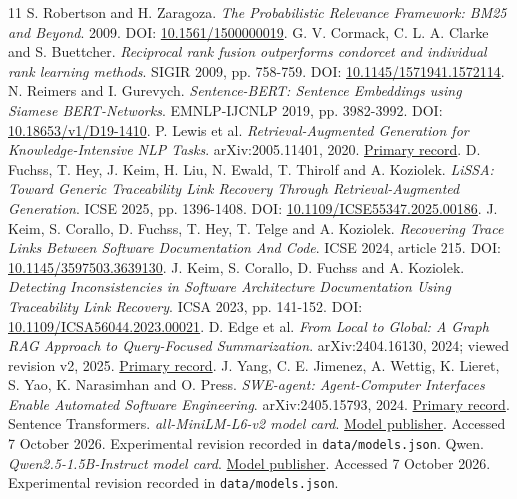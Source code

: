 \documentclass[conference,a4paper]{IEEEtran}
\begin{document}
\begin{thebibliography}{11}
 S. Robertson and H. Zaragoza. \emph{The Probabilistic Relevance Framework: BM25 and Beyond}. 2009. DOI: \href{https://doi.org/10.1561/1500000019}{10.1561/1500000019}.
 G. V. Cormack, C. L. A. Clarke and S. Buettcher. \emph{Reciprocal rank fusion outperforms condorcet and individual rank learning methods}. SIGIR 2009, pp. 758-759. DOI: \href{https://doi.org/10.1145/1571941.1572114}{10.1145/1571941.1572114}.
 N. Reimers and I. Gurevych. \emph{Sentence-BERT: Sentence Embeddings using Siamese BERT-Networks}. EMNLP-IJCNLP 2019, pp. 3982-3992. DOI: \href{https://aclanthology.org/D19-1410/}{10.18653/v1/D19-1410}.
 P. Lewis et al. \emph{Retrieval-Augmented Generation for Knowledge-Intensive NLP Tasks}. arXiv:2005.11401, 2020. \href{https://arxiv.org/abs/2005.11401}{Primary record}.
 D. Fuchss, T. Hey, J. Keim, H. Liu, N. Ewald, T. Thirolf and A. Koziolek. \emph{LiSSA: Toward Generic Traceability Link Recovery Through Retrieval-Augmented Generation}. ICSE 2025, pp. 1396-1408. DOI: \href{https://ardoco.de/c/icse25}{10.1109/ICSE55347.2025.00186}.
 J. Keim, S. Corallo, D. Fuchss, T. Hey, T. Telge and A. Koziolek. \emph{Recovering Trace Links Between Software Documentation And Code}. ICSE 2024, article 215. DOI: \href{https://ardoco.de/c/icse24}{10.1145/3597503.3639130}.
 J. Keim, S. Corallo, D. Fuchss and A. Koziolek. \emph{Detecting Inconsistencies in Software Architecture Documentation Using Traceability Link Recovery}. ICSA 2023, pp. 141-152. DOI: \href{https://ardoco.de/c/icsa23}{10.1109/ICSA56044.2023.00021}.
 D. Edge et al. \emph{From Local to Global: A Graph RAG Approach to Query-Focused Summarization}. arXiv:2404.16130, 2024; viewed revision v2, 2025. \href{https://arxiv.org/abs/2404.16130}{Primary record}.
 J. Yang, C. E. Jimenez, A. Wettig, K. Lieret, S. Yao, K. Narasimhan and O. Press. \emph{SWE-agent: Agent-Computer Interfaces Enable Automated Software Engineering}. arXiv:2405.15793, 2024. \href{https://arxiv.org/abs/2405.15793}{Primary record}.
 Sentence Transformers. \emph{all-MiniLM-L6-v2 model card}. \href{https://huggingface.co/sentence-transformers/all-MiniLM-L6-v2}{Model publisher}. Accessed 7 October 2026. Experimental revision recorded in \texttt{data/models.json}.
 Qwen. \emph{Qwen2.5-1.5B-Instruct model card}. \href{https://huggingface.co/Qwen/Qwen2.5-1.5B-Instruct}{Model publisher}. Accessed 7 October 2026. Experimental revision recorded in \texttt{data/models.json}.
\end{thebibliography}
\end{document}
